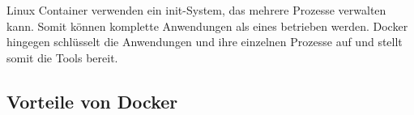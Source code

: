 Linux Container verwenden ein init-System, das mehrere Prozesse verwalten kann. Somit können
komplette Anwendungen als eines betrieben werden. Docker hingegen schlüsselt die Anwendungen und
ihre einzelnen Prozesse auf und stellt somit die Tools bereit.

\subsection{Vorteile von Docker}


\cite{Docker}
\label{Docker}